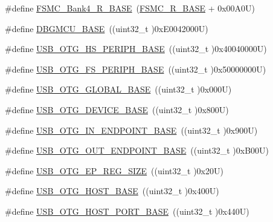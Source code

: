 \begin{DoxyCompactItemize}
\item 
\#define \hyperlink{group___peripheral__registers__structures_gaf9e5417133160b0bdd0498d982acec19}{F\+S\+M\+C\+\_\+\+Bank4\+\_\+\+R\+\_\+\+B\+A\+SE}~(\hyperlink{group___peripheral__registers__structures_gaddf0e199dccba83272b20c9fb4d3aaed}{F\+S\+M\+C\+\_\+\+R\+\_\+\+B\+A\+SE} + 0x00\+A0\+U)
\item 
\#define \hyperlink{group___peripheral__registers__structures_ga4adaf4fd82ccc3a538f1f27a70cdbbef}{D\+B\+G\+M\+C\+U\+\_\+\+B\+A\+SE}~((uint32\+\_\+t )0x\+E0042000\+U)
\item 
\#define \hyperlink{group___peripheral__registers__structures_gaa405d2ebfd7e9394237b6639f16a5409}{U\+S\+B\+\_\+\+O\+T\+G\+\_\+\+H\+S\+\_\+\+P\+E\+R\+I\+P\+H\+\_\+\+B\+A\+SE}~((uint32\+\_\+t )0x40040000\+U)
\item 
\#define \hyperlink{group___peripheral__registers__structures_gaa86d4c80849a74938924e73937b904e7}{U\+S\+B\+\_\+\+O\+T\+G\+\_\+\+F\+S\+\_\+\+P\+E\+R\+I\+P\+H\+\_\+\+B\+A\+SE}~((uint32\+\_\+t )0x50000000\+U)
\item 
\#define \hyperlink{group___peripheral__registers__structures_ga044aa4388e72d9d47a03f387fb8926fb}{U\+S\+B\+\_\+\+O\+T\+G\+\_\+\+G\+L\+O\+B\+A\+L\+\_\+\+B\+A\+SE}~((uint32\+\_\+t )0x000\+U)
\item 
\#define \hyperlink{group___peripheral__registers__structures_ga4d74a337597a77b1fca978202b519a18}{U\+S\+B\+\_\+\+O\+T\+G\+\_\+\+D\+E\+V\+I\+C\+E\+\_\+\+B\+A\+SE}~((uint32\+\_\+t )0x800\+U)
\item 
\#define \hyperlink{group___peripheral__registers__structures_gad8f69041452615aeb3948600e3882246}{U\+S\+B\+\_\+\+O\+T\+G\+\_\+\+I\+N\+\_\+\+E\+N\+D\+P\+O\+I\+N\+T\+\_\+\+B\+A\+SE}~((uint32\+\_\+t )0x900\+U)
\item 
\#define \hyperlink{group___peripheral__registers__structures_gaf0e972b8f028ecf44a652029efbd4642}{U\+S\+B\+\_\+\+O\+T\+G\+\_\+\+O\+U\+T\+\_\+\+E\+N\+D\+P\+O\+I\+N\+T\+\_\+\+B\+A\+SE}~((uint32\+\_\+t )0x\+B00\+U)
\item 
\#define \hyperlink{group___peripheral__registers__structures_ga6fdb7429ad88e2d69440d6ecc4f4199e}{U\+S\+B\+\_\+\+O\+T\+G\+\_\+\+E\+P\+\_\+\+R\+E\+G\+\_\+\+S\+I\+ZE}~((uint32\+\_\+t )0x20\+U)
\item 
\#define \hyperlink{group___peripheral__registers__structures_ga3bb2dd6c82eefd8587b6146ba36ae071}{U\+S\+B\+\_\+\+O\+T\+G\+\_\+\+H\+O\+S\+T\+\_\+\+B\+A\+SE}~((uint32\+\_\+t )0x400\+U)
\item 
\#define \hyperlink{group___peripheral__registers__structures_ga42f433cb79ca69f09972e690fda6737a}{U\+S\+B\+\_\+\+O\+T\+G\+\_\+\+H\+O\+S\+T\+\_\+\+P\+O\+R\+T\+\_\+\+B\+A\+SE}~((uint32\+\_\+t )0x440\+U)

\end{DoxyCompactItemize}

